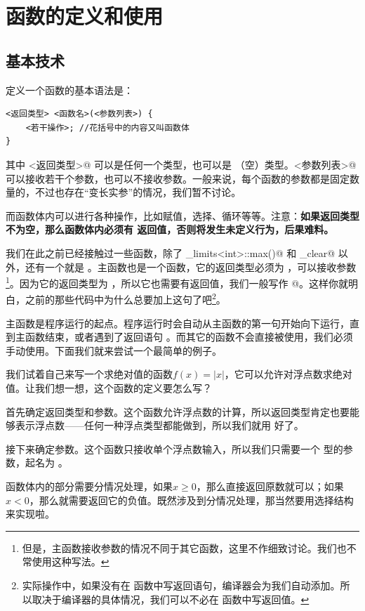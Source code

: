 \section{函数的定义和使用}
\subsection*{基本技术}
定义一个函数的基本语法是：
\begin{lstlisting}
<返回类型> <函数名>(<参数列表>) {
    <若干操作>; //花括号中的内容又叫函数体
}
\end{lstlisting}
其中 \lstinline@<返回类型>@ 可以是任何一个类型，也可以是 \lstinline@void@（空）类型。\lstinline@<参数列表>@ 可以接收若干个参数，也可以不接收参数。一般来说，每个函数的参数都是固定数量的，不过也存在``变长实参''的情况，我们暂不讨论。\par
而函数体内可以进行各种操作，比如赋值，选择、循环等等。注意：\textbf{如果返回类型不为空，那么函数体内必须有 \lstinline@return@ 返回值，否则将发生未定义行为，后果难料。}\par
我们在此之前已经接触过一些函数，除了 \lstinline@numeric_limits<int>::max()@ 和 \lstinline@input_clear@ 以外，还有一个就是 \lstinline@main@。主函数也是一个函数，它的返回类型必须为 \lstinline@int@，可以接收参数\footnote{但是，主函数接收参数的情况不同于其它函数，这里不作细致讨论。我们也不常使用这种写法。}。因为它的返回类型为 \lstinline@int@，所以它也需要有返回值，我们一般写作 @。这样你就明白，之前的那些代码中为什么总要加上这句了吧\footnote{实际操作中，如果没有在 \lstinline@main@ 函数中写返回语句，编译器会为我们自动添加。所以取决于编译器的具体情况，我们可以不必在 \lstinline@main@ 函数中写返回值。}。\par
主函数是程序运行的起点。程序运行时会自动从主函数的第一句开始向下运行，直到主函数结束，或者遇到了返回语句 \lstinline@return@。而其它的函数不会直接被使用，我们必须手动使用。下面我们就来尝试一个最简单的例子。\par
我们试着自己来写一个求绝对值的函数$f(x)=\left|x\right|$，它可以允许对浮点数求绝对值。让我们想一想，这个函数的定义要怎么写？\par
首先确定返回类型和参数。这个函数允许浮点数的计算，所以返回类型肯定也要能够表示浮点数——任何一种浮点类型都能做到，所以我们就用 \lstinline@double@ 好了。\par
接下来确定参数。这个函数只接收单个浮点数输入，所以我们只需要一个 \lstinline@double@ 型的参数，起名为 \lstinline@x@。\par
函数体内的部分需要分情况处理，如果$x\ge0$，那么直接返回原数就可以；如果$x<0$，那么就需要返回它的负值。既然涉及到分情况处理，那当然要用选择结构来实现啦。
